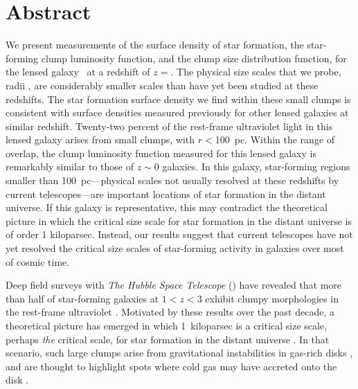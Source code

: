 \section{Abstract}
We present measurements of the surface density of star formation, 
the star-forming clump luminosity function, and the clump size distribution function, 
for the lensed galaxy \giantarc\ at a redshift of $z=$\zA .
The physical size scales that we probe, radii \rangeofscales, 
are considerably smaller scales  than have yet been studied at these redshifts.  
The star formation surface density we find within these small clumps is consistent with
surface densities measured previously for other lensed galaxies at similar redshift.  
Twenty-two percent of the rest-frame ultraviolet light in this lensed galaxy arises
from small clumps,  with $r<$100~pc. 
Within the range of overlap, the clump luminosity function  measured for this 
lensed galaxy is remarkably similar to those of $z\sim0$ galaxies.  
In this galaxy, star-forming regions smaller than 100~pc---physical scales not 
usually resolved  at these redshifts by current  telescopes---are important locations 
of star formation in the distant universe.  If this galaxy is representative, 
this may contradict the theoretical picture in which the critical size scale for star
formation in the distant universe is of order 1 kiloparsec.
Instead, our results suggest that current telescopes have not yet resolved the critical size scales of star-forming activity 
in galaxies over most of cosmic time.  


Deep field surveys with \textit{The Hubble Space Telescope}  (\hst) 
have revealed that more than half of star-forming galaxies 
at $1< z < 3$ exhibit clumpy morphologies in the rest-frame 
ultraviolet \citep{Shibuya:2016wt}.  Motivated by these  results over 
the past decade,  a theoretical picture has emerged in which 
1~kiloparsec is a critical size scale, perhaps {\it the} critical scale, for 
star formation in the distant universe 
\citep{Elmegreen:2005xy, Elmegreen:2007qv, Elmegreen:2009nr, Forster-Schreiber:2011sf, 
Guo:2011rm, Guo:2015zl}.  
In that scenario, such large clumps arise from gravitational instabilities in gas-rich disks 
\citep{Toomre:1964fr, Noguchi:1999vf, Genzel:2011ys},
and are thought to highlight spots where cold gas may have accreted onto the disk 
\citep{Keres:2005yq, Dekel:2006qf, Brooks:2009jk}.

